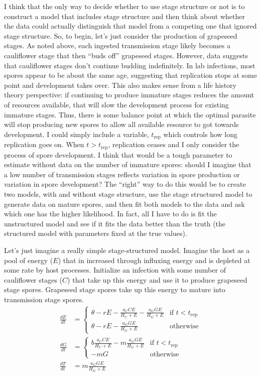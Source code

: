 \documentclass[11pt,reqno,final,pdftex]{amsart}\usepackage[]{graphicx}\usepackage[]{color}
\theoremstyle{plain}
\numberwithin{equation}{part}
\begin{document}
I think that the only way to decide whether to use stage structure or not is to construct a model that includes stage structure and then think about whether the data could actually distinguish that model from a competing one that ignored stage structure.
So, to begin, let's just consider the production of grapeseed stages.
As noted above, each ingested transmission stage likely becomes a cauliflower stage that then ``buds off'' grapeseed stages.
However, data suggests that cauliflower stages don't continue budding indefinitely.
In lab infections, most spores appear to be about the same age, suggesting that replication stops at some point and development takes over.
This also makes sense from a life history theory perspective: if continuing to produce immature stages reduces the amount of resources available, that will slow the development process for existing immature stages.
Thus, there is some balance point at which the optimal parasite will stop producing new spores to allow all available resource to got towards development.
I could simply include a variable, $t_{\text{rep}}$ which controls how long replication goes on.
When $t > t_{\text{rep}}$, replication ceases and I only consider the process of spore development.
I think that would be a tough parameter to estimate without data on the number of immature spores: should I imagine that a low number of transmission stages reflects variation in spore production or variation in spore development?
The ``right'' way to do this would be to create two models, with and without stage structure, use the stage structured model to generate data on mature spores, and then fit both models to the data and ask which one has the higher likelihood.
In fact, all I have to do is fit the unstructured model and see if it fits the data better than the truth (the structured model with parameters fixed at the true values).

Let's just imagine a really simple stage-structured model.
Imagine the host as a pool of energy ($E$) that in increased through influxing energy and is depleted at some rate by host processes.
Initialize an infection with some number of cauliflower stages ($C$) that take up this energy and use it to produce grapeseed stage spores.
Grapeseed stage spores take up this energy to mature into transmission stage spores.
\begin{align*}
\frac{dE}{dt} &=
\begin{cases}
\theta - rE - \frac{a_C C E}{H_C + E} - \frac{a_G G E}{H_G + E} & \text{if $t < t_{\text{rep}}$} \\
\theta - rE - \frac{a_G G E}{H_G + E} & \text{otherwise}
\end{cases}
\\
\frac{dG}{dt} &=
\begin{cases}
b \frac{a_C C E}{H_C + E} - m \frac{a_G G E}{H_G + E} & \text{if $t < t_{\text{rep}}$} \\
-m G & \text{otherwise}
\end{cases}
\\
\frac{dT}{dt} &=  m \frac{a_G G E}{H_G + E}
\end{align*}
\end{document}
